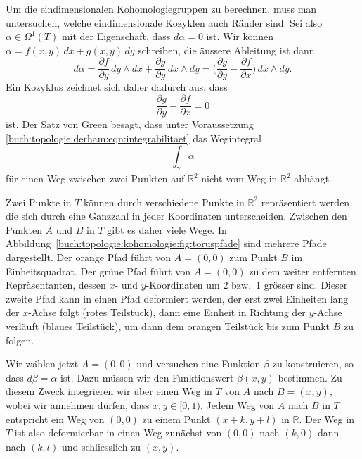 Um die eindimensionalen Kohomologiegruppen zu berechnen, muss man
untersuchen, welche eindimensionale Kozyklen auch Ränder sind.
Sei also $\alpha\in \Omega^1(T)$ mit der Eigenschaft, dass $d\alpha=0$
ist.
Wir können $\alpha = f(x,y)\,dx + g(x,y)\,dy$ schreiben, die äussere Ableitung
ist dann
\[
d\alpha
=
\frac{\partial f}{\partial y}\,dy\wedge dx
+
\frac{\partial g}{\partial y}\,dx\wedge dy
=
\biggl(\frac{\partial g}{\partial y}-\frac{\partial f}{\partial x}\biggr)
\,dx\wedge dy.
\]
Ein Kozyklus zeichnet sich daher dadurch aus, dass
\begin{equation}
\frac{\partial g}{\partial y}-\frac{\partial f}{\partial x}
=
0
\label{buch:topologie:derham:eqn:integrabilitaet}
\end{equation}
ist.
Der Satz von Green besagt, dass unter Voraussetzung
\eqref{buch:topologie:derham:eqn:integrabilitaet}
das Wegintegral
\[
\int_\gamma \alpha
\]
für einen Weg zwischen zwei Punkten auf $\mathbb{R}^2$ nicht vom Weg
in $\mathbb{R}^2$ abhängt.

Zwei Punkte in $T$ können durch verschiedene Punkte in
$\mathbb{R}^2$ repräsentiert werden, die sich durch eine Ganzzahl
in jeder Koordinaten unterscheiden.
Zwischen den Punkten $A$ und $B$ in $T$ gibt es daher viele Wege.
In Abbildung~\ref{buch:topologie:kohomologie:fig:toruspfade} sind
mehrere Pfade dargestellt.
Der orange Pfad führt von $A=(0,0)$ zum Punkt $B$ im Einheitsquadrat.
Der grüne Pfad führt von $A=(0,0)$ zu dem weiter entfernten
Repräsentanten, dessen $x$- und $y$-Koordinaten um 2 bzw.~1 grösser
sind.
Dieser zweite Pfad kann in einen Pfad deformiert werden, der erst
zwei Einheiten lang der $x$-Achse folgt ({\color{darkred}rotes}
Teilstück), dann eine Einheit in Richtung der $y$-Achse verläuft
({\color{blue}blaues} Teilstück), um dann dem {\color{orange}orangen}
Teilstück bis zum Punkt $B$ zu folgen.

Wir wählen jetzt $A=(0,0)$ und versuchen eine Funktion $\beta$ zu
konstruieren, so dass $d\beta =\alpha$ ist.
Dazu müssen wir den Funktionswert $\beta(x,y)$ bestimmen.
Zu diesem Zweck integrieren wir über einen Weg in $T$ von $A$ nach
$B=(x,y)$, wobei wir annehmen dürfen, dass $x,y\in[0,1)$.
Jedem Weg von $A$ nach $B$ in $T$ entspricht ein Weg von $(0,0)$
zu einem Punkt $(x+k,y+l)$ in $\mathbb{R}$.
Der Weg in $T$ ist also deformierbar in einen Weg
zunächst von $(0,0)$ nach $(k,0)$ dann nach $(k,l)$ und schliesslich
zu $(x,y)$.

